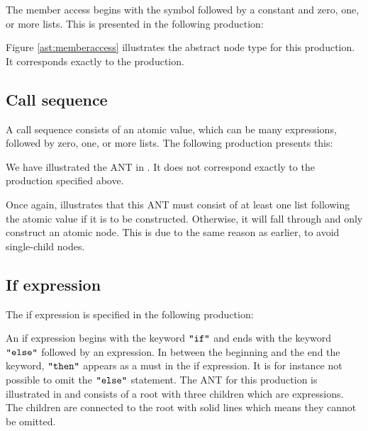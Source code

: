 The member access begins with the  symbol followed by a constant and
zero, one, or more lists. This is presented in the following production:

\begin{ebnf}
\end{ebnf}

Figure \ref{ast:memberaccess} illustrates the abstract node type for this
production. It corresponds exactly to the production.



\subsection{Call sequence}

A call sequence consists of an atomic value, which can be many expressions,
followed by zero, one, or more lists. The following production presents this:

\begin{ebnf}
\end{ebnf}

We have illustrated the ANT in . It does not correspond
exactly to the production specified above.




Once again,  illustrates that this ANT must consist of
at least one list following the atomic value if it is to be constructed.
Otherwise, it will fall through and only construct an atomic node. This is due
to the same reason as earlier, to avoid single-child nodes.

\subsection{If expression}
The if expression is specified in the following production:

\begin{ebnf}
\end{ebnf}

An if expression begins with the keyword $\texttt{"if"}$ and ends with the keyword
$\texttt{"else"}$ followed by an expression. In between the beginning and the end the
keyword, $\texttt{"then"}$ appears as a must in the if expression. It is for instance not
possible to omit the $\texttt{"else"}$ statement. The ANT for this production is
illustrated in  and consists of a root with three children
which are expressions. The children are connected to the root with solid lines
which means they cannot be omitted.

